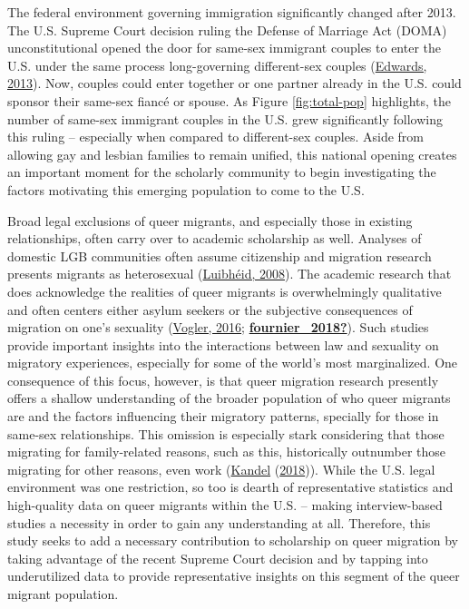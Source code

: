 \documentclass[
  12pt,
]{article}
\begin{document}
The federal environment governing immigration significantly changed after 2013. The U.S. Supreme Court decision ruling the Defense of Marriage Act (DOMA) unconstitutional opened the door for same-sex immigrant couples to enter the U.S. under the same process long-governing different-sex couples (\protect\hyperlink{ref-edwards_2013}{Edwards, 2013}). Now, couples could enter together or one partner already in the U.S. could sponsor their same-sex fiancé or spouse. As Figure \ref{fig:total-pop} highlights, the number of same-sex immigrant couples in the U.S. grew significantly following this ruling -- especially when compared to different-sex couples. Aside from allowing gay and lesbian families to remain unified, this national opening creates an important moment for the scholarly community to begin investigating the factors motivating this emerging population to come to the U.S.

Broad legal exclusions of queer migrants, and especially those in existing relationships, often carry over to academic scholarship as well. Analyses of domestic LGB communities often assume citizenship and migration research presents migrants as heterosexual (\protect\hyperlink{ref-luibheid_2008}{Luibhéid, 2008}). The academic research that does acknowledge the realities of queer migrants is overwhelmingly qualitative and often centers either asylum seekers or the subjective consequences of migration on one's sexuality (\protect\hyperlink{ref-vogler_2016}{Vogler, 2016}; \protect\hyperlink{ref-fournier_2018}{\textbf{fournier\_2018?}}). Such studies provide important insights into the interactions between law and sexuality on migratory experiences, especially for some of the world's most marginalized. One consequence of this focus, however, is that queer migration research presently offers a shallow understanding of the broader population of who queer migrants are and the factors influencing their migratory patterns, specially for those in same-sex relationships. This omission is especially stark considering that those migrating for family-related reasons, such as this, historically outnumber those migrating for other reasons, even work (\protect\hyperlink{ref-kandel_2018_familybased}{Kandel} (\protect\hyperlink{ref-kandel_2018_familybased}{2018})). While the U.S. legal environment was one restriction, so too is dearth of representative statistics and high-quality data on queer migrants within the U.S. -- making interview-based studies a necessity in order to gain any understanding at all. Therefore, this study seeks to add a necessary contribution to scholarship on queer migration by taking advantage of the recent Supreme Court decision and by tapping into underutilized data to provide representative insights on this segment of the queer migrant population.
\end{document}
